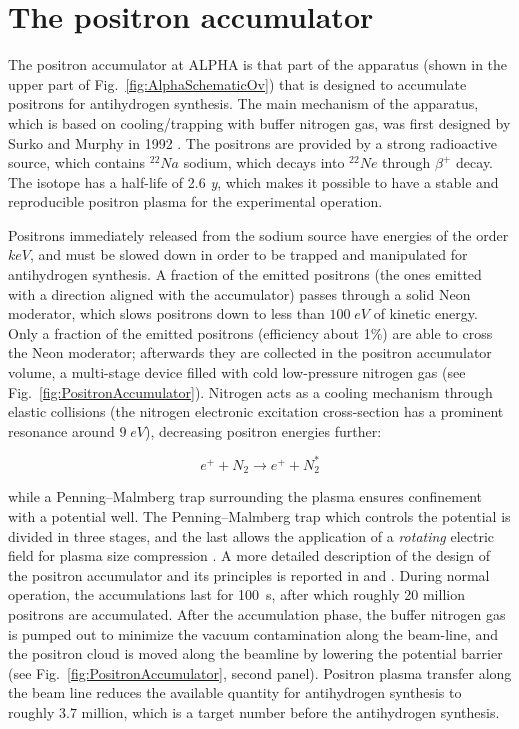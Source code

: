 \section{The positron accumulator}

The positron accumulator at ALPHA is that part of the apparatus (shown in the upper part of Fig.~\ref{fig:AlphaSchematicOv}) that is designed to accumulate positrons for antihydrogen synthesis. The main mechanism of the apparatus, which is based on cooling/trapping with buffer nitrogen gas, was first designed by Surko and Murphy in 1992 \cite{MurphySurko1992}.
The positrons are provided by a strong radioactive source, which contains $^{22}Na$ sodium, which decays into $^{22}Ne$ through $\beta^{+}$ decay. The isotope has a half-life of 2.6 \textit{y}, which makes it possible to have a stable and reproducible positron plasma for the experimental operation.

Positrons immediately released from the sodium source have energies of the order $keV$, and must be slowed down in order to be trapped and manipulated for antihydrogen synthesis. A fraction of the emitted positrons (the ones emitted with a direction aligned with the accumulator) passes through a solid Neon moderator, which slows positrons down to less than $100 \; eV$ of kinetic energy. Only a fraction of the emitted positrons (efficiency about 1\%) are able to cross the Neon moderator; afterwards they are collected in the positron accumulator volume, a multi-stage device filled with cold low-pressure nitrogen gas (see Fig.~\ref{fig:PositronAccumulator}). Nitrogen acts as a cooling mechanism through elastic collisions (the nitrogen electronic excitation cross-section has a prominent resonance around $9 \; eV$), decreasing positron energies further:

\begin{equation}
e^{+} + N_{2} \rightarrow e^{+} + N^{*}_{2}
\end{equation}

while a Penning--Malmberg trap surrounding the plasma ensures confinement with a potential well. The Penning--Malmberg trap which controls the potential is divided in three stages, and the last allows the application of a \textit{rotating} electric field for plasma size compression \cite{Anderegg:2016rw}. A more detailed description of the design of the positron accumulator and its principles is reported in \cite{10.1063/1.859558} and \cite{10.1063/1.870693}. During normal operation, the accumulations last for \SI{100}{\second}, after which roughly 20 million positrons are accumulated. After the accumulation phase, the buffer nitrogen gas is pumped out to minimize the vacuum contamination along the beam-line, and the positron cloud is moved along the beamline by lowering the potential barrier (see Fig.~\ref{fig:PositronAccumulator}, second panel). Positron plasma transfer along the beam line reduces the available quantity for antihydrogen synthesis to roughly $3.7$ million, which is a target number before the antihydrogen synthesis.

